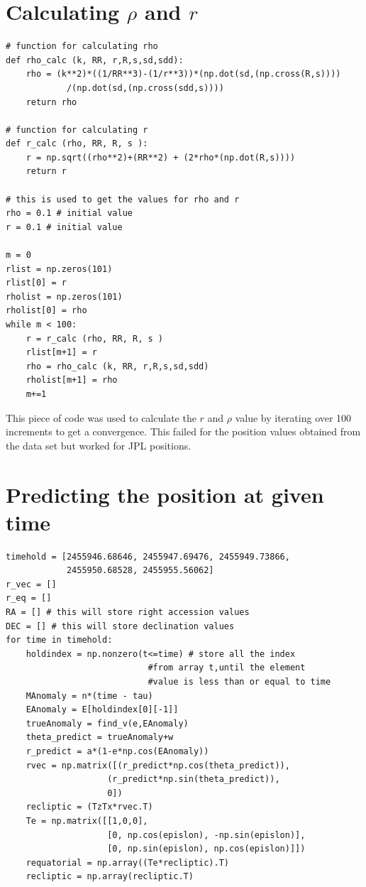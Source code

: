 \documentclass[a4paper,12pt]{article}
\begin{document}
\begin{appendices}
\section{Calculating $\rho$ and $r$ }

\begin{lstlisting}
# function for calculating rho
def rho_calc (k, RR, r,R,s,sd,sdd):
    rho = (k**2)*((1/RR**3)-(1/r**3))*(np.dot(sd,(np.cross(R,s))))
            /(np.dot(sd,(np.cross(sdd,s))))
    return rho

# function for calculating r
def r_calc (rho, RR, R, s ):
    r = np.sqrt((rho**2)+(RR**2) + (2*rho*(np.dot(R,s))))
    return r

# this is used to get the values for rho and r
rho = 0.1 # initial value
r = 0.1 # initial value

m = 0
rlist = np.zeros(101) 
rlist[0] = r
rholist = np.zeros(101)
rholist[0] = rho
while m < 100:
    r = r_calc (rho, RR, R, s )
    rlist[m+1] = r
    rho = rho_calc (k, RR, r,R,s,sd,sdd)
    rholist[m+1] = rho
    m+=1
\end{lstlisting}
This piece of code was used to calculate the $r$ and $\rho$ value by iterating over 100 increments to get a convergence. This failed for the position values obtained from the data set but worked for JPL positions. 

\section{Predicting the position at given time}
\begin{lstlisting}
timehold = [2455946.68646, 2455947.69476, 2455949.73866, 
            2455950.68528, 2455955.56062]
r_vec = []
r_eq = []
RA = [] # this will store right accession values
DEC = [] # this will store declination values
for time in timehold:
    holdindex = np.nonzero(t<=time) # store all the index 
                            #from array t,until the element 
                            #value is less than or equal to time
    MAnomaly = n*(time - tau)
    EAnomaly = E[holdindex[0][-1]] 
    trueAnomaly = find_v(e,EAnomaly)
    theta_predict = trueAnomaly+w
    r_predict = a*(1-e*np.cos(EAnomaly))
    rvec = np.matrix([(r_predict*np.cos(theta_predict)),
                    (r_predict*np.sin(theta_predict)),
                    0])
    recliptic = (TzTx*rvec.T)
    Te = np.matrix([[1,0,0],
                    [0, np.cos(epislon), -np.sin(epislon)],
                    [0, np.sin(epislon), np.cos(epislon)]])
    requatorial = np.array((Te*recliptic).T)
    recliptic = np.array(recliptic.T)
    

\end{lstlisting}
\end{appendices}
\end{document}
